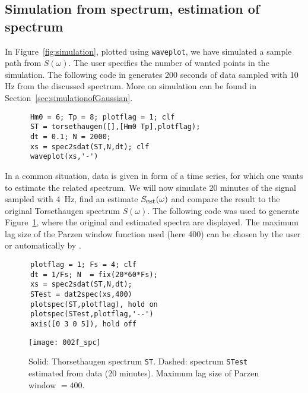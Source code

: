   \subsection{Simulation from spectrum, estimation of spectrum}%

  In Figure~\ref{fig:simulation}, plotted using {\tt waveplot},
  we have simulated a sample path from
  $S(\omega)$. 
  The user specifies the number of wanted points in
  the simulation.  The following code in  \ML{}
  generates 200 seconds of data sampled with 10 Hz
  from the discussed spectrum. More on simulation can be found in
  Section~\ref{sec:simulationofGaussian}. 
{\small\begin{verbatim}
      Hm0 = 6; Tp = 8; plotflag = 1; clf
      ST = torsethaugen([],[Hm0 Tp],plotflag);
      dt = 0.1; N = 2000;
      xs = spec2sdat(ST,N,dt); clf
      waveplot(xs,'-')
\end{verbatim}}

In a  common situation, data is given in form of a time
series, for which one wants to estimate the related spectrum.
We will now simulate 20 minutes of the signal sampled with 4~Hz,
find an estimate $S_{\mbox{\footnotesize est}}(\omega)$ and compare the
result to the original Torsethaugen spectrum $S(\omega)$.
The following code was used to generate Figure~\ref{fig:spectra},
where the original and estimated spectra are displayed. The maximum
lag size of the Parzen window function used (here 400) can be chosen
by the user or automatically by \progname{}. 
{\small\begin{verbatim}
      plotflag = 1; Fs = 4; clf
      dt = 1/Fs; N  = fix(20*60*Fs);
      xs = spec2sdat(ST,N,dt);
      STest = dat2spec(xs,400)
      plotspec(ST,plotflag), hold on
      plotspec(STest,plotflag,'--')
      axis([0 3 0 5]), hold off
\end{verbatim}}


  \begin{figure}[tbh]
    \centering
    \texttt{[image: 002f\_spc]}
\vspace{-3mm}
    \caption[Example of estimated spectrum]{Solid: 
      Thorsethaugen spectrum {\tt ST}.
  Dashed:  spectrum {\tt STest} estimated from
  data (20 minutes). %
  Maximum lag size of Parzen window $=400$.}
  \label{fig:spectra}
  \end{figure}
\label{page:torsethaugen}
